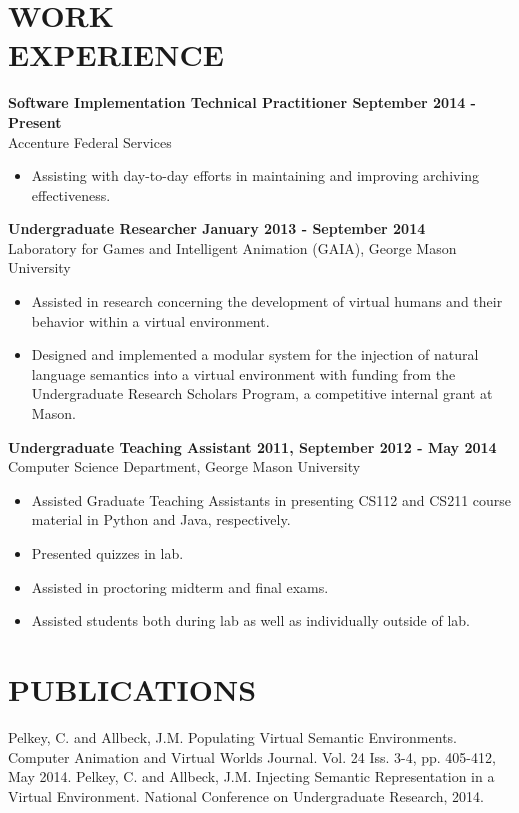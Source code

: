 \documentclass[line, margin]{res}
\begin{document}
\begin{resume}
\section{WORK \\ EXPERIENCE}
    \textbf{Software Implementation Technical Practitioner \hfill September 2014 - Present} \\
    Accenture Federal Services
    \begin{itemize}  \itemsep -2pt %
        \item Assisting with day-to-day efforts in maintaining and improving archiving effectiveness.
    \end{itemize}
	\textbf{Undergraduate Researcher \hfill January 2013 - September 2014} \\
	Laboratory for Games and Intelligent Animation (GAIA), George Mason University
	\begin{itemize}  \itemsep -2pt %
		\item Assisted in research concerning the development of virtual humans and their behavior within a virtual environment.
		\item Designed and implemented a modular system for the injection of natural language semantics into a virtual environment with funding from the Undergraduate Research Scholars Program, a competitive internal grant at Mason.
	\end{itemize}
	\textbf{Undergraduate Teaching Assistant \hfill 2011, September 2012 - May 2014} \\
	Computer Science Department, George Mason University
	\begin{itemize}  \itemsep -2pt %
		\item Assisted Graduate Teaching Assistants in presenting CS112 and CS211 course material in Python and Java, respectively.
		\item Presented quizzes in lab.
		\item Assisted in proctoring midterm and final exams.
		\item Assisted students both during lab as well as individually outside of lab.
	\end{itemize}

\section{PUBLICATIONS}
	Pelkey, C. and Allbeck, J.M. Populating Virtual Semantic Environments. Computer Animation and Virtual Worlds Journal. Vol. 24 Iss. 3-4, pp. 405-412, May 2014.\vspace{5pt}
	Pelkey, C. and Allbeck, J.M. Injecting Semantic Representation in a Virtual Environment. National Conference on Undergraduate Research, 2014.


\end{resume}
\end{document}
